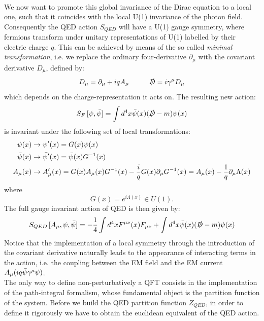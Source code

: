 \\ We now want to promote this global invariance of the Dirac equation to a local one, such that it coincides with the local U(1) invariance of the photon field. Consequently the QED action $S_{QED}$ will have a U(1) gauge symmetry, where fermions transform under unitary representations of U(1) labelled by their electric charge $q$. This can be achieved by means of the so called \textit{minimal transformation}, i.e. we replace the ordinary four-derivative $\partial_\mu$ with the covariant derivative $D_\mu$, defined by:
\begin{equation}
    D_\mu = \partial_\mu + iq A_\mu \hspace{10mm} \slashed{D} = i\gamma^\mu D_\mu
\end{equation}
which depends on the charge-representation it acts on. The resulting new action:
\begin{equation}\label{free Dirac cont}
    S_F \, [\psi, \Bar{\psi}] = \int d^4x \Bar{\psi}(x) (\slashed{D} - m) \psi(x)
\end{equation}
is invariant under the following set of local transformations:
\begin{equation}
\begin{split}
        \psi(x) & \to \psi'(x) = G(x) \psi(x) \\
    \Bar{\psi}(x) & \to \Bar{\psi'}(x) = \Bar{\psi}(x) G^{-1}(x) \\
    A_\mu (x) & \to A'_\mu(x) = G(x) A_\mu(x) G^{-1}(x) - \frac{i}{q} G(x) \partial_\mu G^{-1}(x) = A_\mu(x) - \frac{1}{q}\partial_\mu \Lambda(x)
\end{split}
\end{equation}
where
\begin{equation*}
    G(x) = e^{i\Lambda(x)} \in U(1).
\end{equation*}
The full gauge invariant action of QED is then given by:
\begin{equation}
    S_{QED} \, [A_\mu, \psi, \Bar{\psi}] = -\frac{1}{4}\int d^4x F^{\mu\nu}(x) F_{\mu\nu} + \int d^4x \Bar{\psi}(x) (\slashed{D} - m) \psi(x)
\end{equation}
Notice that the implementation of a local symmetry through the introduction of the covariant derivative naturally leads to the appearance of interacting terms in the action, i.e. the coupling between the EM field and the EM current $A_\mu (iq \Bar{\psi} \gamma^\mu \psi)$.
\\ The only way to define non-perturbatively a QFT consists in the implementation of the path-integral formalism, whose fundamental object is the partition function of the system. Before we build the QED partition function $Z_{QED}$, in order to define it rigorously we have to obtain the euclidean equivalent of the QED action. 
